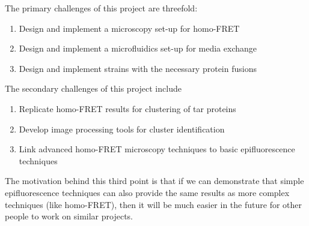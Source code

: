 \documentclass[../main.tex]{subfiles}
\begin{document}
The primary challenges of this project are threefold:
\begin{enumerate}
\item Design and implement a microscopy set-up for homo-FRET
\item Design and implement a microfluidics set-up for media exchange
\item Design and implement \ecoli strains with the necessary protein fusions
\end{enumerate}

The secondary challenges of this project include
\begin{enumerate}
\item Replicate homo-FRET results for clustering of tar proteins
\item Develop image processing tools for cluster identification
\item Link advanced homo-FRET microscopy techniques to basic epifluorescence techniques
\end{enumerate}
The motivation behind this third point is that if we can demonstrate that simple epifluorescence techniques can also provide the same results as more complex techniques (like homo-FRET), then it will be much easier in the future for other people to work on similar projects.
\end{document}
